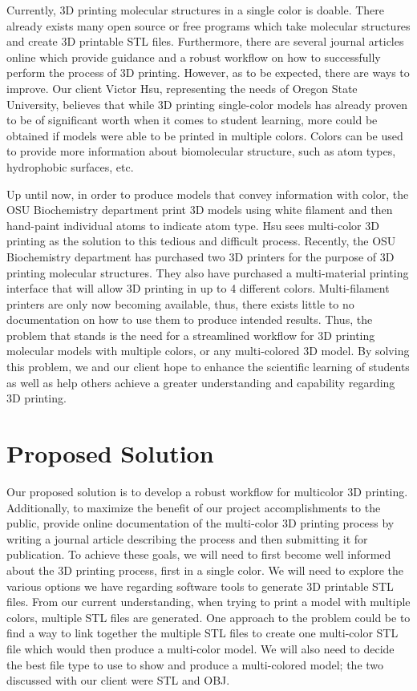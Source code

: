 \documentclass[onecolumn, draftclsnofoot,10pt, compsoc]{IEEEtran}
\begin{document}
Currently, 3D printing molecular structures in a single color is doable. 
There already exists many open source or free programs which take molecular structures and create 3D printable STL files.
Furthermore, there are several journal articles online which provide guidance and a robust workflow on how to successfully perform the process of 3D printing.  
However, as to be expected, there are ways to improve. 
Our client Victor Hsu, representing the needs of Oregon State University, believes that while 3D printing single-color models has already proven to be of significant worth when it comes to student learning, more could be obtained if models were able to be printed in multiple colors. 
Colors can be used to provide more information about biomolecular structure, such as atom types, hydrophobic surfaces, etc. 

Up until now, in order to produce models that convey information with color, the OSU Biochemistry department print 3D models using white filament and then hand-paint individual atoms to indicate atom type. 
Hsu sees multi-color 3D printing as the solution to this tedious and difficult process.
Recently, the OSU Biochemistry department has purchased two 3D printers for the purpose of 3D printing molecular structures. 
They also have purchased a multi-material printing interface that will allow 3D printing in up to 4 different colors. 
Multi-filament printers are only now becoming available, thus, there exists little to no documentation on how to use them to produce intended results. 
Thus, the problem that stands is the need for a streamlined workflow for 3D printing molecular models with multiple colors, or any multi-colored 3D model.
By solving this problem, we and our client hope to enhance the scientific learning of students as well as help others achieve a greater understanding and capability regarding 3D printing. 

\section{Proposed Solution}
Our proposed solution is to develop a robust workflow for multicolor 3D printing. 
Additionally, to maximize the benefit of our project accomplishments to the public, provide online documentation of the multi-color 3D printing process by writing a journal article describing the process and then submitting it for publication. 
To achieve these goals, we will need to first become well informed about the 3D printing process, first in a single color. 
We will need to explore the various options we have regarding software tools to generate 3D printable STL files.
From our current understanding, when trying to print a model with multiple colors, multiple STL files are generated.
One approach to the problem could be to find a way to link together the multiple STL files to create one multi-color STL file which would then produce a multi-color model.
We will also need to decide the best file type to use to show and produce a multi-colored model; the two discussed with our client were STL and OBJ. 
\end{document}
